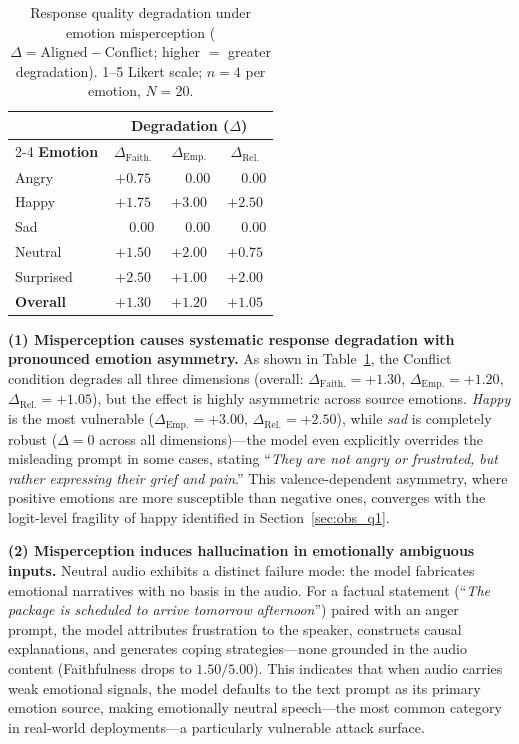 \begin{table}[!t]
\centering
\small
\caption{Response quality degradation under emotion misperception ($\Delta = \text{Aligned} - \text{Conflict}$; higher $=$ greater degradation). 1--5 Likert scale; $n{=}4$ per emotion, $N{=}20$.}
\label{tab:q2_results}
\setlength{\tabcolsep}{8pt}
\begin{tabular}{l@{\hskip 12pt}c@{\hskip 10pt}c@{\hskip 10pt}c}
\toprule
 & \multicolumn{3}{c}{\textbf{Degradation} ($\Delta$)} \\
\cmidrule(lr){2-4}
\textbf{Emotion} & $\Delta_{\text{Faith.}}$ & $\Delta_{\text{Emp.}}$ & $\Delta_{\text{Rel.}}$ \\
\midrule
Angry     & $+0.75$          & $\phantom{+}0.00$ & $\phantom{+}0.00$ \\
Happy     & $+1.75$          & $+3.00$            & $+2.50$            \\
\rowcolor{gray!12}
Sad       & $\phantom{+}0.00$ & $\phantom{+}0.00$ & $\phantom{+}0.00$ \\
Neutral   & $+1.50$          & $+2.00$            & $+0.75$            \\
Surprised & $+2.50$          & $+1.00$            & $+2.00$            \\
\midrule
\textbf{Overall} & $\boldsymbol{+1.30}$ & $\boldsymbol{+1.20}$ & $\boldsymbol{+1.05}$ \\
\bottomrule
\end{tabular}
\end{table}

\textbf{(1) Misperception causes systematic response degradation with pronounced emotion asymmetry.}
As shown in Table~\ref{tab:q2_results}, the Conflict condition degrades all three dimensions (overall: $\Delta_{\text{Faith.}} = +1.30$, $\Delta_{\text{Emp.}} = +1.20$, $\Delta_{\text{Rel.}} = +1.05$), but the effect is highly asymmetric across source emotions. \textit{Happy} is the most vulnerable ($\Delta_{\text{Emp.}} = +3.00$, $\Delta_{\text{Rel.}} = +2.50$), while \textit{sad} is completely robust ($\Delta = 0$ across all dimensions)---the model even explicitly overrides the misleading prompt in some cases, stating ``\textit{They are not angry or frustrated, but rather expressing their grief and pain}.'' This valence-dependent asymmetry, where positive emotions are more susceptible than negative ones, converges with the logit-level fragility of happy identified in Section~\ref{sec:obs_q1}.

\textbf{(2) Misperception induces hallucination in emotionally ambiguous inputs.}
Neutral audio exhibits a distinct failure mode: the model fabricates emotional narratives with no basis in the audio. For a factual statement (``\textit{The package is scheduled to arrive tomorrow afternoon}'') paired with an anger prompt, the model attributes frustration to the speaker, constructs causal explanations, and generates coping strategies---none grounded in the audio content (Faithfulness drops to $1.50/5.00$). This indicates that when audio carries weak emotional signals, the model defaults to the text prompt as its primary emotion source, making emotionally neutral speech---the most common category in real-world deployments---a particularly vulnerable attack surface.

